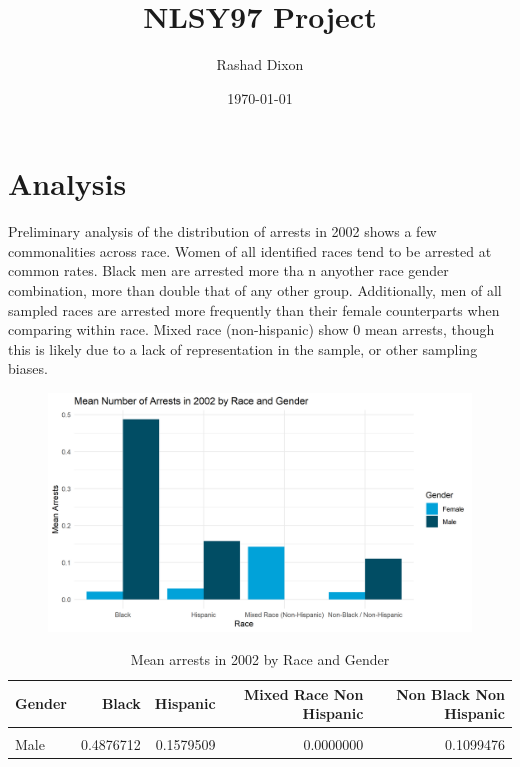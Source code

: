 \documentclass{article}
\begin{document}
\title{NLSY97 Project}
\author{Rashad Dixon}
\date{\today}
\maketitle
\section{Analysis}
	Preliminary analysis of the distribution of arrests in 2002 shows a few commonalities across race.
Women of all identified races tend to be arrested at common rates. Black men are arrested more tha
n anyother race gender combination, more than double that of any other group. Additionally, men of 
all sampled races are arrested more frequently than their female counterparts when comparing within 
race. Mixed race (non-hispanic) show 0 mean arrests, though this is likely due to a lack of representation
 in the sample, or other sampling biases. 

\begin{figure}[H]
\centering
\includegraphics[scale = .75]{arrests_by_racegender.png}
\end{figure}

\begin{table}[H]

\caption{\label{tab:tab:summarystats}Mean arrests in 2002 by Race and Gender}
\centering
\begin{tabular}[t]{lrrrr}
\toprule
Gender & Black & Hispanic & Mixed Race Non Hispanic & Non Black Non Hispanic\\
\midrule
\cellcolor{gray!6}{Female} & \cellcolor{gray!6}{0.0211268} & \cellcolor{gray!6}{0.0298013} & \cellcolor{gray!6}{0.1428571} & \cellcolor{gray!6}{0.0193192}\\
Male & 0.4876712 & 0.1579509 & 0.0000000 & 0.1099476\\
\bottomrule
\end{tabular}
\end{table}
\end{document}
